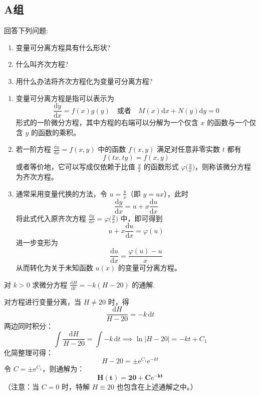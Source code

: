 \documentclass[lang=cn,11pt]{elegantbook}
\begin{document}
\subsection{A组}

\begin{exercise}[相关概念]
回答下列问题:
\begin{enumerate}
    \item[(1)] 变量可分离方程具有什么形状?
    \item[(2)] 什么叫齐次方程?
    \item[(3)] 用什么办法将齐次方程化为变量可分离方程?
\end{enumerate}
\end{exercise}
\begin{solution}
\begin{enumerate}
    \item[(1)] 变量可分离方程是指可以表示为 
    \[
    \frac{\mathrm{d}y}{\mathrm{d}x} = f(x)g(y) \quad \text{或者} \quad M(x)\mathrm{d}x + N(y)\mathrm{d}y = 0 
    \]
    形式的一阶微分方程，其中方程的右端可以分解为一个仅含 $x$ 的函数与一个仅含 $y$ 的函数的乘积。
    
    \item[(2)] 若一阶方程 $\displaystyle\frac{\mathrm{d}y}{\mathrm{d}x} = f(x,y)$ 中的函数 $f(x,y)$ 满足对任意非零实数 $t$ 都有 
    \[
    f(tx,ty) = f(x,y)
    \]
    或者等价地，它可以写成仅依赖于比值 $\frac{y}{x}$ 的函数形式 $\varphi\big(\frac{y}{x}\big)$，则称该微分方程为齐次方程。
    
    \item[(3)] 通常采用变量代换的方法，令 $u = \frac{y}{x}$（即 $y = ux$），此时 
    \[
    \frac{\mathrm{d}y}{\mathrm{d}x} = u + x\frac{\mathrm{d}u}{\mathrm{d}x}
    \]
    将此式代入原齐次方程 $\frac{\mathrm{d}y}{\mathrm{d}x} = \varphi\big(\frac{y}{x}\big)$ 中，即可得到 
    \[
    u + x\frac{\mathrm{d}u}{\mathrm{d}x} = \varphi(u)
    \]
    进一步变形为 
    \[
    \frac{\mathrm{d}u}{\mathrm{d}x} = \frac{\varphi(u)-u}{x}
    \]
    从而转化为关于未知函数 $u(x)$ 的变量可分离方程。
\end{enumerate}
\end{solution}

\begin{exercise}[求解方程]
对 $k>0$ 求微分方程 $\displaystyle \frac{\mathrm{d}H}{\mathrm{d}t}=-k(H-20)$ 的通解.
\end{exercise}
\begin{solution}
对方程进行变量分离，当 $H \neq 20$ 时，得
\[
\frac{\mathrm{d}H}{H-20} = -k\,\mathrm{d}t
\]
两边同时积分：
\[
\int \frac{\mathrm{d}H}{H-20} = \int -k\,\mathrm{d}t \implies \ln|H-20| = -kt + C_1
\]
化简整理可得：
\[
H-20 = \pm\mathrm{e}^{C_1}\mathrm{e}^{-kt}
\]
令 $C = \pm\mathrm{e}^{C_1}$，则通解为：
\[
\mathbf{H(t) = 20 + C\mathrm{e}^{-kt}}
\]
（注意：当 $C=0$ 时，特解 $H \equiv 20$ 也包含在上述通解之中。）
\end{solution}
\end{document}
